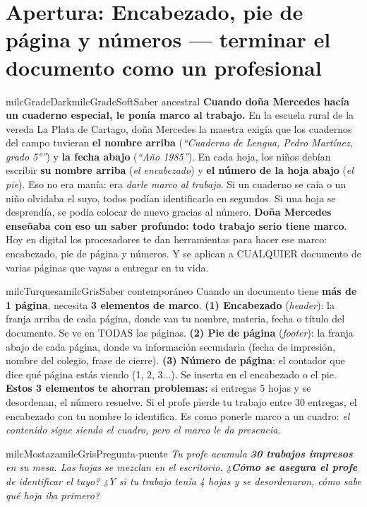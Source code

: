 \documentclass[11pt,letterpaper]{article}
\begin{document}
\section*{Apertura: Encabezado, pie de página y números --- terminar el documento como un profesional}

\begin{softbox}{milcGradeDark}{milcGradeSoft}{Saber ancestral}
\textbf{Cuando doña Mercedes hacía un cuaderno especial, le ponía marco al trabajo.} En la escuela rural de la vereda La Plata de Cartago, doña Mercedes la maestra exigía que los cuadernos del campo tuvieran \textbf{el nombre arriba} (\emph{``Cuaderno de Lengua, Pedro Martínez, grado 5°''}) y \textbf{la fecha abajo} (\emph{``Año 1985''}). En cada hoja, los niños debían escribir \textbf{su nombre arriba} (\emph{el encabezado}) y \textbf{el número de la hoja abajo} (\emph{el pie}). Eso no era manía: era \emph{darle marco al trabajo}. Si un cuaderno se caía o un niño olvidaba el suyo, todos podían identificarlo en segundos. Si una hoja se desprendía, se podía colocar de nuevo gracias al número. \textbf{Doña Mercedes enseñaba con eso un saber profundo: todo trabajo serio tiene marco}. Hoy en digital los procesadores te dan herramientas para hacer ese marco: encabezado, pie de página y números. Y se aplican a CUALQUIER documento de varias páginas que vayas a entregar en tu vida.
\end{softbox}

\begin{softbox}{milcTurquesa}{milcGris}{Saber contemporáneo}
Cuando un documento tiene \textbf{más de 1 página}, necesita \textbf{3 elementos de marco}. \textbf{(1) Encabezado} (\emph{header}): la franja arriba de cada página, donde van tu nombre, materia, fecha o título del documento. Se ve en TODAS las páginas. \textbf{(2) Pie de página} (\emph{footer}): la franja abajo de cada página, donde va información secundaria (fecha de impresión, nombre del colegio, frase de cierre). \textbf{(3) Número de página}: el contador que dice qué página estás viendo (1, 2, 3...). Se inserta en el encabezado o el pie. \textbf{Estos 3 elementos te ahorran problemas:} si entregas 5 hojas y se desordenan, el número resuelve. Si el profe pierde tu trabajo entre 30 entregas, el encabezado con tu nombre lo identifica. Es como ponerle marco a un cuadro: \emph{el contenido sigue siendo el cuadro, pero el marco le da presencia}.
\end{softbox}

\begin{softbox}{milcMostaza}{milcGris}{Pregunta-puente}
\textit{Tu profe acumula \textbf{30 trabajos impresos} en su mesa. Las hojas se mezclan en el escritorio. ¿\textbf{Cómo se asegura el profe} de identificar el tuyo? ¿Y si tu trabajo tenía 4 hojas y se desordenaron, cómo sabe qué hoja iba primero?}
\end{softbox}
\end{document}
